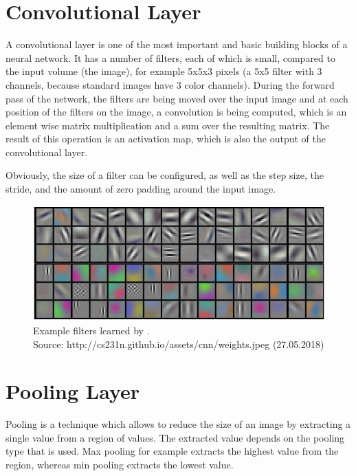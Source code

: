\section{Convolutional Layer}
A convolutional layer is one of the most important and basic building blocks of a neural network. It has a number of filters, each of which is small, compared to the input volume (the image), for example 5x5x3 pixels (a 5x5 filter with 3 channels, because standard images have 3 color channels). During the forward pass of the network, the filters are being moved over the input image and at each position of the filters on the image, a convolution is being computed, which is an element wise matrix multiplication and a sum over the resulting matrix. The result of this operation is an activation map, which is also the output of the convolutional layer.

Obviously, the size of a filter can be configured, as well as the step size, the stride, and the amount of zero padding around the input image.

\begin{figure}[H]
    \centering
	\includegraphics[width=0.6\linewidth]{chapters/neural_networks/images/example_filters.jpeg}
	\caption{Example filters learned by \cite{Krizhevsky.2012}.\\ Source: http://cs231n.github.io/assets/cnn/weights.jpeg (27.05.2018)}
	\label{fig:neural_networks:example_filters}
\end{figure}

\section{Pooling Layer}
Pooling is a technique which allows to reduce the size of an image by extracting a single value from a region of values. The extracted value depends on the pooling type that is used. Max pooling for example extracts the highest value from the region, whereas min pooling extracts the lowest value.

